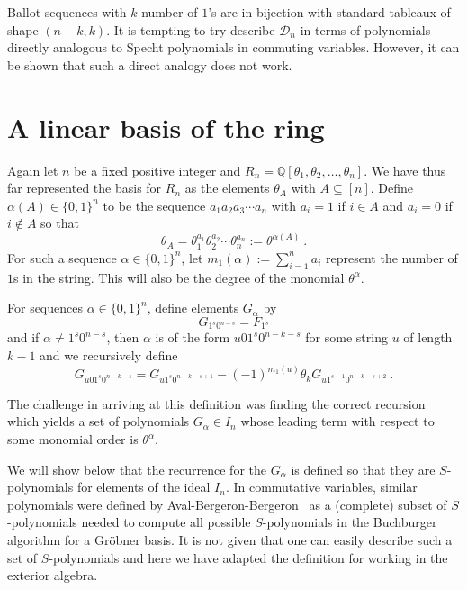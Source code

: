 \documentclass[submission]{FPSAC2023}
\theoremstyle{definition}
\numberwithin{equation}{section}
\begin{document}
Ballot sequences with $k$ number of $1$'s are in bijection with standard tableaux of shape $(n-k,k)$. It is tempting to try describe $\mathcal{D}_{n}$ in terms of polynomials directly analogous to Specht polynomials in commuting variables. However, it can be shown that such a direct analogy does not work.

\section{A linear basis of the ring}\label{sec:linbasis}

Again let $n$ be a fixed positive integer and $R_n = {\mathbb Q}[\theta_1, \theta_2, \ldots, \theta_n]$.
We have thus far represented the basis for
$R_n$ as the elements $\theta_A$ with $A \subseteq [n]$.  Define $\alpha(A) \in \{ 0,1\}^n$ to be
the sequence $a_1 a_2 a_3 \cdots a_n$ with $a_i = 1$ if $i \in A$ and
$a_i = 0$ if $i \notin A$ so that
\[
\theta_A = \theta_1^{a_1} \theta_2^{a_2} \cdots \theta_n^{a_n} := \theta^{\alpha(A)}~.
\]
For such a sequence $\alpha \in \{0,1\}^n$, let $m_1(\alpha) := \sum_{i=1}^n a_i$
represent the number of $1$s in the string.  This will also be the degree of the monomial
$\theta^{\alpha}$.

For sequences $\alpha \in \{ 0, 1 \}^n$, define elements $G_\alpha$ by
\begin{equation}\label{eq:Gdef1}
G_{1^s0^{n-s}} = F_{1^s}
\end{equation}
and if $\alpha \neq 1^s 0^{n-s}$, then $\alpha$ is of the form $u01^s0^{n-k-s}$ for some string $u$
of length $k-1$ and we recursively define
\begin{equation}\label{eq:Gdef2}
G_{u01^s0^{n-k-s}} = G_{u1^s0^{n-k-s+1}} - (-1)^{m_1(u)} \theta_k G_{u1^{s-1}0^{n-k-s+2}}~.
\end{equation}

The challenge in arriving at this definition was finding the correct recursion which yields a set of
polynomials $G_\alpha \in I_n$ whose leading term with respect to some monomial order is $\theta^\alpha$.

We will show below that the recurrence for the
$G_\alpha$ is defined so that they are $S$-polynomials \cite{CLO}
for elements of the ideal $I_n$.
In commutative variables, similar polynomials were defined by Aval-Bergeron-Bergeron~\cite{ABB,AB}
as a (complete) subset of $S$-polynomials needed to compute all possible
$S$-polynomials in the Buchburger algorithm for a Gr\"obner basis.
It is not given that one can easily describe such a set of $S$-polynomials and here we have adapted
the definition for working in the exterior algebra.
\end{document}

